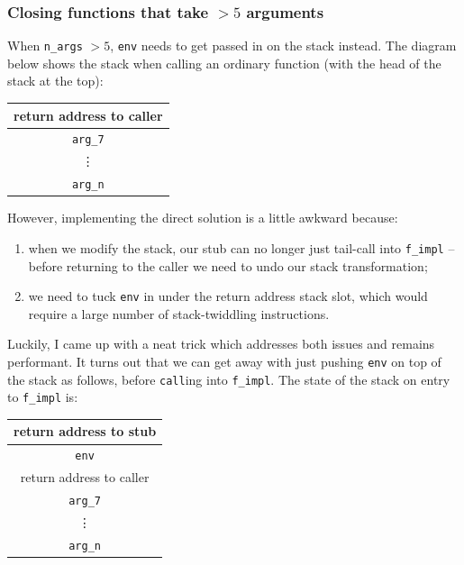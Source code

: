 \documentclass[12pt,a4paper,twoside,openright]{report}
\begin{document}
\subsubsection{Closing functions that take $> 5$ arguments}

When \lstinline!n_args! $> 5$, \lstinline!env! needs to get passed in on the
stack instead. The diagram below shows the stack when calling an ordinary
function (with the head of the stack at the top):

\begin{center}
\begin{tabular}{c}
  return address to caller
  \\ \hline\hline
  \lstinline!arg_7!
  \\ \hline
  \vdots
  \\ \hline
  \lstinline!arg_n!
\end{tabular}
\end{center}

However, implementing the direct solution is a little awkward because:
\begin{enumerate}
  \item when we modify the stack, our stub can no longer just tail-call
    into \lstinline!f_impl! -- before returning to the caller we need to undo
    our stack transformation;
  \item we need to tuck \lstinline!env! in under the return address
    stack slot, which would require a large number of stack-twiddling
    instructions.
\end{enumerate}

Luckily, I came up with a neat trick which addresses both issues and remains
performant. It turns out that we can get away with just pushing \lstinline!env!
on top of the stack as follows, before \lstinline!call!ing into
\lstinline!f_impl!. The state of the stack on entry to \lstinline!f_impl! is:

\begin{center}
\begin{tabular}{c}
  return address to stub
  \\ \hline\hline
  \lstinline!env!
  \\ \hline
  return address to caller
  \\ \hline
  \lstinline!arg_7!
  \\ \hline
  \vdots
  \\ \hline
  \lstinline!arg_n!
\end{tabular}
\end{center}
\end{document}
